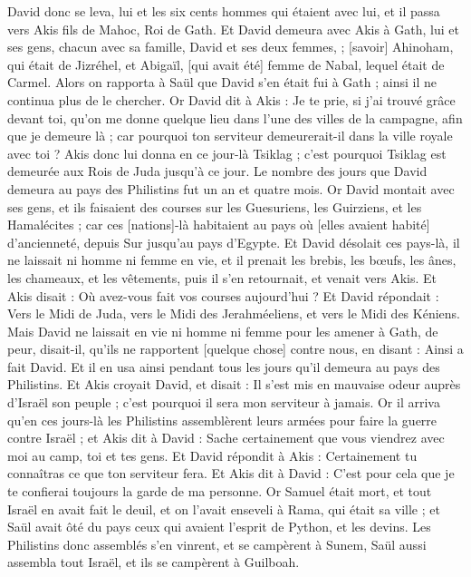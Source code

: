 \begin{multicols}{2}
David donc se leva, lui et les six cents hommes qui étaient avec lui, et il passa vers Akis fils de Mahoc, Roi de Gath.
Et David demeura avec Akis à Gath, lui et ses gens, chacun avec sa famille, David et ses deux femmes, ; [savoir] Ahinoham, qui était de Jizréhel, et Abigaïl, [qui avait été] femme de Nabal, lequel était de Carmel.
Alors on rapporta à Saül que David s'en était fui à Gath ; ainsi il ne continua plus de le chercher.
Or David dit à Akis : Je te prie, si j'ai trouvé grâce devant toi, qu'on me donne quelque lieu dans l'une des villes de la campagne, afin que je demeure là ; car pourquoi ton serviteur demeurerait-il dans la ville royale avec toi ?
Akis donc lui donna en ce jour-là Tsiklag ; c'est pourquoi Tsiklag est demeurée aux Rois de Juda jusqu'à ce jour.
Le nombre des jours que David demeura au pays des Philistins fut un an et quatre mois.
Or David montait avec ses gens, et ils faisaient des courses sur les Guesuriens, les Guirziens, et les Hamalécites ; car ces [nations]-là habitaient au pays où [elles avaient habité] d'ancienneté, depuis Sur jusqu'au pays d'Egypte.
Et David désolait ces pays-là, il ne laissait ni homme ni femme en vie, et il prenait les brebis, les bœufs, les ânes, les chameaux, et les vêtements, puis il s'en retournait, et venait vers Akis.
Et Akis disait : Où avez-vous fait vos courses aujourd'hui ? Et David répondait : Vers le Midi de Juda, vers le Midi des Jerahméeliens, et vers le Midi des Kéniens.
Mais David ne laissait en vie ni homme ni femme pour les amener à Gath, de peur, disait-il, qu'ils ne rapportent [quelque chose] contre nous, en disant : Ainsi a fait David. Et il en usa ainsi pendant tous les jours qu'il demeura au pays des Philistins.
Et Akis croyait David, et disait : Il s'est mis en mauvaise odeur auprès d'Israël son peuple ; c'est pourquoi il sera mon serviteur à jamais.
\VerseOne{}Or il arriva qu'en ces jours-là les Philistins assemblèrent leurs armées pour faire la guerre contre Israël ; et Akis dit à David : Sache certainement que vous viendrez avec moi au camp, toi et tes gens.
Et David répondit à Akis : Certainement tu connaîtras ce que ton serviteur fera. Et Akis dit à David : C'est pour cela que je te confierai toujours la garde de ma personne.
Or Samuel était mort, et tout Israël en avait fait le deuil, et on l'avait enseveli à Rama, qui était sa ville ; et Saül avait ôté du pays ceux qui avaient l'esprit de Python, et les devins.
Les Philistins donc assemblés s'en vinrent, et se campèrent à Sunem, Saül aussi assembla tout Israël, et ils se campèrent à Guilboah.

\end{multicols}
